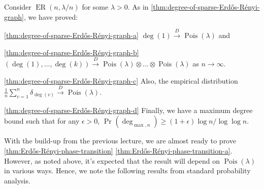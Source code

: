 \begin{prev}
	Consider \(\operatorname{ER}(n, \lambda / n) \) for some \(\lambda > 0\). As in \autoref{thm:degree-of-sparse-Erdős-Rényi-graph}, we have proved:
	\begin{enumerate*}
		\item[\autoref{thm:degree-of-sparse-Erdős-Rényi-graph-a}] \(\deg (1) \overset{D}{\to} \operatorname{Pois}(\lambda ) \) and
		\item[\autoref{thm:degree-of-sparse-Erdős-Rényi-graph-b}] \((\deg (1), \dots , \deg (k)) \overset{D}{\to} \operatorname{Pois}(\lambda ) \otimes \dots \otimes \operatorname{Pois}(\lambda ) \) as \(n \to \infty \).
		\item[\autoref{thm:degree-of-sparse-Erdős-Rényi-graph-c}] Also, the empirical distribution \(\frac{1}{n}\sum_{v=1}^{n} \delta _{\deg (v)} \overset{D}{\to} \operatorname{Pois}(\lambda ) \).
		\item[\autoref{thm:degree-of-sparse-Erdős-Rényi-graph-d}] Finally, we have a maximum degree bound such that for any \(\epsilon > 0\), \(\Pr_{}(\deg _{\max , n}) \geq (1 + \epsilon ) \log n / \log \log n \).
	\end{enumerate*}
\end{prev}

With the build-up from the previous lecture, we are almost ready to prove \autoref{thm:Erdős-Rényi-phase-transition} \autoref{thm:Erdős-Rényi-phase-transition-a}. However, as noted above, it's expected that the result will depend on \(\operatorname{Pois}(\lambda ) \) in various ways. Hence, we note the following results from standard probability analysis.

